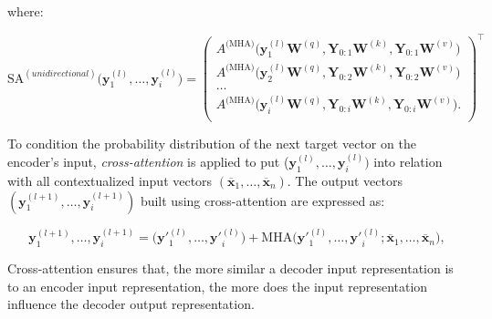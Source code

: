 \noindent where:

\begin{equation}
    \textrm{SA}^{(unidirectional)}\bigl(\bm{y}^{(l)}_1, \ldots, \bm{y}^{(l)}_i\bigr) =
    {\begin{pmatrix}
        A^{\textrm{(MHA)}}\bigl(\bm{y}^{(l)}_1 \bm{W}^{(q)}, \bm{Y}_{0:1}\bm{W}^{(k)}, \bm{Y}_{0:1}\bm{W}^{(v)}\bigr)\\ 
        A^{\textrm{(MHA)}}\bigl(\bm{y}^{(l)}_2 \bm{W}^{(q)}, \bm{Y}_{0:2}\bm{W}^{(k)}, \bm{Y}_{0:2}\bm{W}^{(v)}\bigr)\\ 
        \ldots \\
        A^{\textrm{(MHA)}}\bigl(\bm{y}^{(l)}_i \bm{W}^{(q)}, \bm{Y}_{0:i}\bm{W}^{(k)}, \bm{Y}_{0:i}\bm{W}^{(v)}\bigr). \\
    \end{pmatrix}}^{\top}
\end{equation}



To condition the probability distribution of the next target vector on the encoder's input, \textit{cross-attention} is applied to put ($\bm{y}^{(l)}_1, \ldots, \bm{y}^{(l)}_i)$ into relation with all contextualized input vectors $(\overline{\bm{x}}_1, \ldots, \overline{\bm{x}}_n)$. The output vectors $(\bm{y}^{(l+1)}_1, \ldots, \bm{y}^{(l+1)}_i)$ built using cross-attention are expressed as:

\begin{equation}
    \bm{y}^{(l+1)}_1, \ldots, \bm{y}^{(l+1)}_{i} = \bigl(\bm{y}'^{(l)}_1, \ldots, \bm{y}'^{(l)}_{i}\bigr) + \textrm{MHA}\bigl(\bm{y}'^{(l)}_1, \ldots, \bm{y}'^{(l)}_{i}; \overline{\bm{x}}_1, \ldots, \overline{\bm{x}}_n\bigr),
\end{equation}



\noindent Cross-attention ensures that, the more similar a decoder input representation is to an encoder input representation, the more does the input representation influence the decoder output representation.

